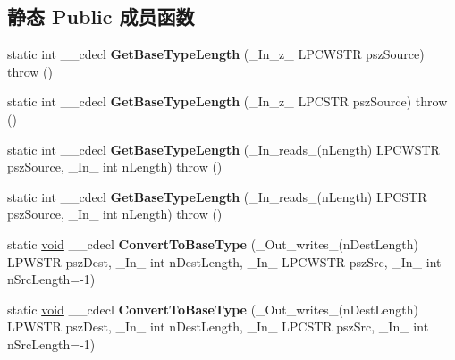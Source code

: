 \subsection*{静态 Public 成员函数}
\begin{DoxyCompactItemize}
\item 
\mbox{\label{class_a_t_l_1_1_ch_traits_c_r_t_ae564e5c52e90e7cd4596cf8ddb664325}} 
static int \+\_\+\+\_\+cdecl {\bfseries Get\+Base\+Type\+Length} (\+\_\+\+In\+\_\+z\+\_\+ L\+P\+C\+W\+S\+TR psz\+Source)  throw ()
\item 
\mbox{\label{class_a_t_l_1_1_ch_traits_c_r_t_a54898ddd717f8183dbfe7710b23fb766}} 
static int \+\_\+\+\_\+cdecl {\bfseries Get\+Base\+Type\+Length} (\+\_\+\+In\+\_\+z\+\_\+ L\+P\+C\+S\+TR psz\+Source)  throw ()
\item 
\mbox{\label{class_a_t_l_1_1_ch_traits_c_r_t_a590e9f1182cbec898422df7d6da55bff}} 
static int \+\_\+\+\_\+cdecl {\bfseries Get\+Base\+Type\+Length} (\+\_\+\+In\+\_\+reads\+\_\+(n\+Length) L\+P\+C\+W\+S\+TR psz\+Source, \+\_\+\+In\+\_\+ int n\+Length)  throw ()
\item 
\mbox{\label{class_a_t_l_1_1_ch_traits_c_r_t_aa1308e4b8fa846db8b761658d2b47965}} 
static int \+\_\+\+\_\+cdecl {\bfseries Get\+Base\+Type\+Length} (\+\_\+\+In\+\_\+reads\+\_\+(n\+Length) L\+P\+C\+S\+TR psz\+Source, \+\_\+\+In\+\_\+ int n\+Length)  throw ()
\item 
\mbox{\label{class_a_t_l_1_1_ch_traits_c_r_t_ada306da659ca9364e666bcce52b556d5}} 
static \hyperlink{interfacevoid}{void} \+\_\+\+\_\+cdecl {\bfseries Convert\+To\+Base\+Type} (\+\_\+\+Out\+\_\+writes\+\_\+(n\+Dest\+Length) L\+P\+W\+S\+TR psz\+Dest, \+\_\+\+In\+\_\+ int n\+Dest\+Length, \+\_\+\+In\+\_\+ L\+P\+C\+W\+S\+TR psz\+Src, \+\_\+\+In\+\_\+ int n\+Src\+Length=-\/1)
\item 
\mbox{\label{class_a_t_l_1_1_ch_traits_c_r_t_a83a7432d4443683af9996092742d809c}} 
static \hyperlink{interfacevoid}{void} \+\_\+\+\_\+cdecl {\bfseries Convert\+To\+Base\+Type} (\+\_\+\+Out\+\_\+writes\+\_\+(n\+Dest\+Length) L\+P\+W\+S\+TR psz\+Dest, \+\_\+\+In\+\_\+ int n\+Dest\+Length, \+\_\+\+In\+\_\+ L\+P\+C\+S\+TR psz\+Src, \+\_\+\+In\+\_\+ int n\+Src\+Length=-\/1)

\end{DoxyCompactItemize}
